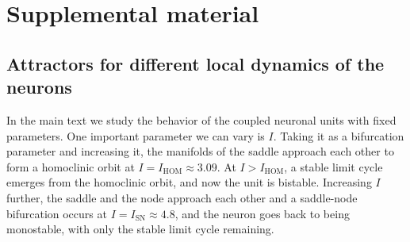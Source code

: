 
\section*{Supplemental material}


\subsection*{Attractors for different local dynamics of the neurons}
In the main text we study the behavior of the coupled neuronal units with fixed parameters. One important parameter we can vary is $I$. Taking it as a bifurcation parameter and increasing it, the manifolds of the saddle approach each other to form a homoclinic orbit at $I = I_\mathrm{HOM} \approx 3.09$. At $I>I_\mathrm{HOM}$, a stable limit cycle emerges from the homoclinic orbit, and now the unit is bistable. Increasing $I$ further, the saddle and the node approach each other and a saddle-node bifurcation occurs at $I = I_\mathrm{SN} \approx 4.8$, and the neuron goes back to being monostable, with only the stable limit cycle remaining.


